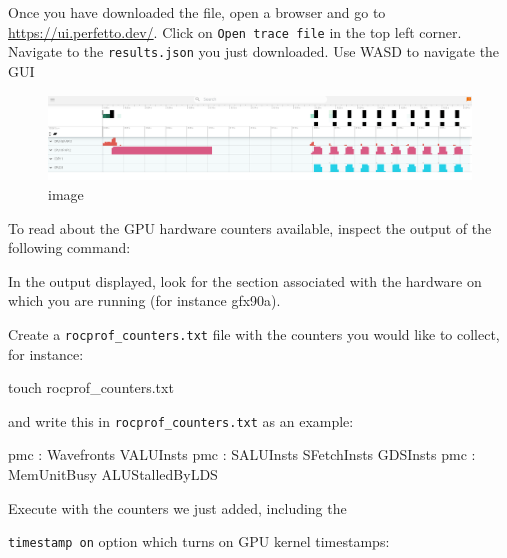 \documentclass[
]{article}
\let\oldtexttt\texttt
\renewcommand{\texttt}[1]{
  \colorbox{Light}{\oldtexttt{#1}}
}
\newenvironment{Shaded}{}{}
\newcommand{\ExtensionTok}[1]{#1}
\newcommand{\FunctionTok}[1]{\textcolor[rgb]{0.02,0.16,0.49}{#1}}
\newcommand{\NormalTok}[1]{#1}
\newcommand{\VariableTok}[1]{\textcolor[rgb]{0.10,0.09,0.49}{#1}}
\begin{document}
Once you have downloaded the file, open a browser and go to
\url{https://ui.perfetto.dev/}. Click on \texttt{Open\ trace\ file} in
the top left corner. Navigate to the \texttt{results.json} you just
downloaded. Use WASD to navigate the GUI

\begin{figure}
\centering
\includegraphics{rocprof/4548abe6eeb76b1896e88fbd38299521eef0d2cd.png}
\caption{image}
\end{figure}

To read about the GPU hardware counters available, inspect the output of
the following command:

\begin{Shaded}
\end{Shaded}

In the output displayed, look for the section associated with the
hardware on which you are running (for instance gfx90a).

Create a \texttt{rocprof\_counters.txt} file with the counters you would
like to collect, for instance:

\begin{Shaded}
\begin{Highlighting}[]
\FunctionTok{touch}\NormalTok{ rocprof\_counters.txt}
\end{Highlighting}
\end{Shaded}

and write this in \texttt{rocprof\_counters.txt} as an example:

\begin{Shaded}
\begin{Highlighting}[]
\ExtensionTok{pmc}\NormalTok{ : Wavefronts VALUInsts}
\ExtensionTok{pmc}\NormalTok{ : SALUInsts SFetchInsts GDSInsts}
\ExtensionTok{pmc}\NormalTok{ : MemUnitBusy ALUStalledByLDS}
\end{Highlighting}
\end{Shaded}

Execute with the counters we just added, including the
\texttt{timestamp\ on} option which turns on GPU kernel timestamps:
\end{document}
